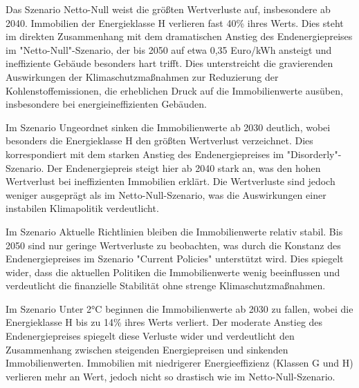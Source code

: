 Das Szenario Netto-Null weist die größten Wertverluste auf, insbesondere ab 2040. Immobilien der Energieklasse H verlieren fast 40\% ihres Werts. Dies steht im direkten Zusammenhang mit dem dramatischen Anstieg des Endenergiepreises im "Netto-Null"-Szenario, der bis 2050 auf etwa 0,35 Euro/kWh ansteigt und ineffiziente Gebäude besonders hart trifft. Dies unterstreicht die gravierenden Auswirkungen der Klimaschutzmaßnahmen zur Reduzierung der Kohlenstoffemissionen, die erheblichen Druck auf die Immobilienwerte ausüben, insbesondere bei energieineffizienten Gebäuden.

Im Szenario Ungeordnet sinken die Immobilienwerte ab 2030 deutlich, wobei besonders die Energieklasse H den größten Wertverlust verzeichnet. Dies korrespondiert mit dem starken Anstieg des Endenergiepreises im "Disorderly"-Szenario. Der Endenergiepreis steigt hier ab 2040 stark an, was den hohen Wertverlust bei ineffizienten Immobilien erklärt. Die Wertverluste sind jedoch weniger ausgeprägt als im Netto-Null-Szenario, was die Auswirkungen einer instabilen Klimapolitik verdeutlicht.

Im Szenario Aktuelle Richtlinien bleiben die Immobilienwerte relativ stabil. Bis 2050 sind nur geringe Wertverluste zu beobachten, was durch die Konstanz des Endenergiepreises im Szenario "Current Policies" unterstützt wird. Dies spiegelt wider, dass die aktuellen Politiken die Immobilienwerte wenig beeinflussen und verdeutlicht die finanzielle Stabilität ohne strenge Klimaschutzmaßnahmen.

Im Szenario Unter 2°C beginnen die Immobilienwerte ab 2030 zu fallen, wobei die Energieklasse H bis zu 14\% ihres Werts verliert. Der moderate Anstieg des Endenergiepreises spiegelt diese Verluste wider und verdeutlicht den Zusammenhang zwischen steigenden Energiepreisen und sinkenden Immobilienwerten. Immobilien mit niedrigerer Energieeffizienz (Klassen G und H) verlieren mehr an Wert, jedoch nicht so drastisch wie im Netto-Null-Szenario.

